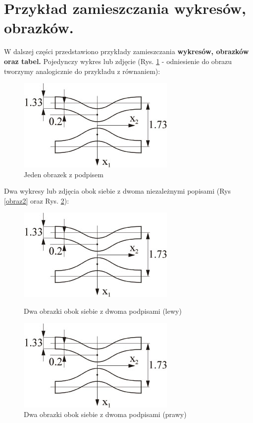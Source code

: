 \documentclass[polish,twoside]{article}
\begin{document}
\section{Przykład zamieszczania wykresów, obrazków.}

W dalszej części przedstawiono przykłady zamieszczania \textbf{wykresów, obrazków oraz tabel.}
Pojedynczy wykres lub zdjęcie (Rys. \ref{obraz1} - odniesienie do obrazu tworzymy analogicznie do przykładu z równaniem):
\begin{figure}[h!]
\centering
\includegraphics[width=0.45\linewidth]{figure1.jpg}
\caption{Jeden obrazek z podpisem}\label{obraz1}
\end{figure}

Dwa wykresy lub zdjęcia obok siebie z dwoma niezależnymi popisami (Rys \ref{obraz2} oraz Rys. \ref{obraz3}):

\begin{figure}[htb]
\centering
\begin{minipage}[t]{0.42\linewidth}
\centering
\includegraphics[width=0.65\linewidth]{figure1.jpg}
\caption{Dwa obrazki obok siebie z dwoma podpisami (lewy)}\label{obraz2}
\end{minipage}
\quad
\begin{minipage}[t]{0.42\linewidth}
\centering
\includegraphics[width=0.65\linewidth]{figure1.jpg}
\caption{Dwa obrazki obok siebie z dwoma podpisami (prawy)}\label{obraz3}
\end{minipage}
\end{figure}
\end{document}
